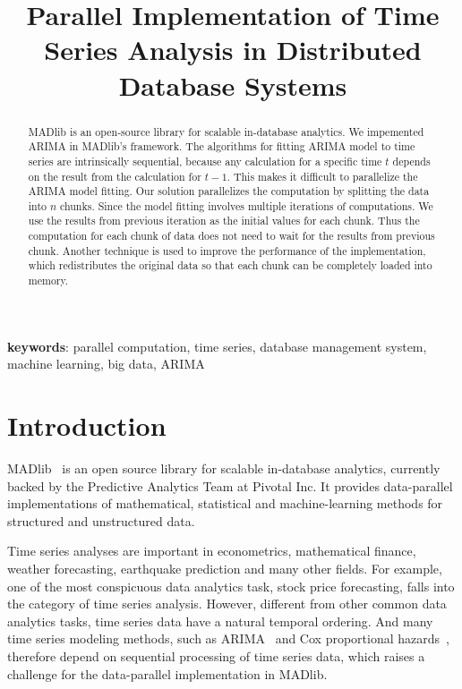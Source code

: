 \documentclass[english,10pt]{llncs}
\begin{document}
\title{{Parallel Implementation of Time Series Analysis in Distributed Database Systems}}



\maketitle

\begin{abstract}
    MADlib is an open-source library for scalable in-database analytics. We
    impemented ARIMA in MADlib's framework. The algorithms for fitting ARIMA
    model to time series are intrinsically sequential, because any calculation
    for a specific time $t$ depends on the result from the calculation for
    $t-1$.  This makes it difficult to parallelize the ARIMA model fitting. Our
    solution parallelizes the computation by splitting the data into $n$
    chunks. Since the model fitting involves multiple iterations of
    computations. We use the results from previous iteration as the initial
    values for each chunk. Thus the computation for each chunk of data does not
    need to wait for the results from previous chunk. Another technique is used
    to improve the performance of the implementation, which redistributes the
    original data so that each chunk can be completely loaded into memory.
\end{abstract}

{\bf keywords}: parallel computation, time series, database management system, machine learning, big data, ARIMA



\section{Introduction}

MADlib~\cite{madlib} is an open source library for scalable
in-database analytics, currently backed by the Predictive Analytics
Team at Pivotal Inc. It provides data-parallel implementations of
mathematical, statistical and machine-learning methods for structured
and unstructured data.

Time series analyses are important in econometrics, mathematical
finance, weather forecasting, earthquake prediction and many other
fields. For example, one of the most conspicuous data analytics task,
stock price forecasting, falls into the category of time series
analysis.
However, different from other common data analytics tasks, time series
data have a natural temporal ordering. And many time series modeling
methods, such as ARIMA~\cite{arima} and Cox proportional
hazards~\cite{cox}, therefore depend on sequential processing of time
series data, which raises a challenge for the data-parallel
implementation in MADlib.
\end{document}
